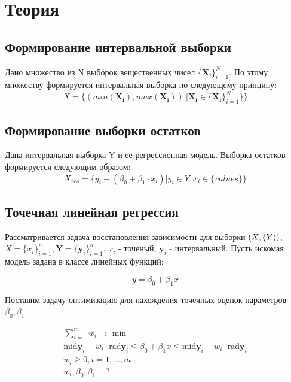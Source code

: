 \documentclass[12pt,a4paper]{article}
\begin{document}
	\section{Теория}
            \subsection{Формирование интервальной выборки}
                Дано множество из N выборок вещественных чисел $\mathbf{\{X_i\}}_{i=1}^N$. По этому множеству формируется интервальная выборка по следующему принципу:
                \begin{equation}
                    X = \{(min(\mathbf{X_i}), max(\mathbf{X_i}))\ | \mathbf{X_i} \in \mathbf{\{X_i\}}_{i=1}^N \}\}
                \end{equation}

            \subsection{Формирование выборки остатков}
                Дана интервальная выборка Y и ее регрессионная модель. Выборка остатков формируется следующим образом:
                \begin{equation}
                    X_{res} = \{y_i - (\beta_0 + \beta_1 \cdot x_i) | y_i \in Y, x_i \in \{values\}\}
                \end{equation}
                
            \subsection{Точечная линейная регрессия}
                Рассматривается задача восстановления зависимости для выборки
                $ (X, \textbf(Y))$, $ X = \{x_i\}_{i=1}^{n}, \textbf{Y} = \{\textbf{y}_i\}_{i=1}^{n} $,
                $ x_i $ - точеный, $ \textbf{y}_i $ - интервальный.
                Пусть искомая модель задана в классе линейных функций:
            
                \begin{equation}
                    y = \beta_0 + \beta_1 x
                \end{equation}
            
                Поставим задачу оптимизацию для нахождения точечных оценок
                параметров $ \beta_0, \beta_1 $.
            
                \begin{equation}
                    \begin{gathered}
                        \sum_{i = 1}^{m}w_{i} \to \min \\
                        \text{mid}\textbf{y}_{i} - w_{i} \cdot \text{rad}\textbf{y}_{i} \leq \beta_0 + \beta_1 x \leq \text{mid}\textbf{y}_{i} + w_{i} \cdot \text{rad}\textbf{y}_{i} \\
                        w_{i} \geq 0, i = 1, ..., m \\
                        {w_i}, \beta_0, \beta_1 - ?
                    \end{gathered}
                    \label{e:task}
                \end{equation}
                
\end{document}
